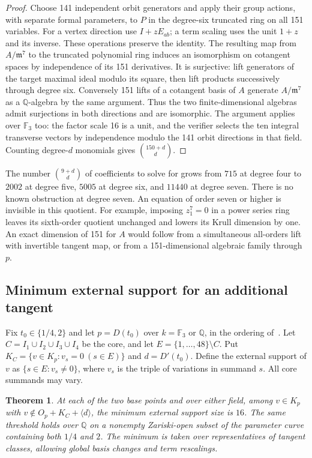 \documentclass[11pt,reqno]{amsart}
\newcommand{\F}{\mathbb F}
\newcommand{\Q}{\mathbb Q}
\newtheorem{theorem}{Theorem}[section]
\begin{document}
\begin{proof}
Choose 141 independent orbit generators and apply their group actions, with separate formal parameters, to \(P\) in the degree-six truncated ring on all 151 variables. For a vertex direction use \(I+zE_{ab}\); a term scaling uses the unit \(1+z\) and its inverse. These operations preserve the identity. The resulting map from \(A/\mathfrak m^7\) to the truncated polynomial ring induces an isomorphism on cotangent spaces by independence of its 151 derivatives. It is surjective: lift generators of the target maximal ideal modulo its square, then lift products successively through degree six. Conversely 151 lifts of a cotangent basis of \(A\) generate \(A/\mathfrak m^7\) as a \(\Q\)-algebra by the same argument. Thus the two finite-dimensional algebras admit surjections in both directions and are isomorphic. The argument applies over \(\F_3\) too: the factor scale 16 is a unit, and the verifier selects the ten integral transverse vectors by independence modulo the 141 orbit directions in that field. Counting degree-\(d\) monomials gives \(\binom{150+d}{d}\).
\end{proof}

The number \(\binom{9+d}{d}\) of coefficients to solve for grows from \(715\) at degree four to \(2002\) at degree five, \(5005\) at degree six, and \(11440\) at degree seven. There is no known obstruction at degree seven. An equation of order seven or higher is invisible in this quotient. For example, imposing \(z_1^7=0\) in a power series ring leaves its sixth-order quotient unchanged and lowers its Krull dimension by one. An exact dimension of 151 for \(A\) would follow from a simultaneous all-orders lift with invertible tangent map, or from a 151-dimensional algebraic family through \(p\).

\subsection*{Minimum external support for an additional tangent}
Fix \(t_0\in\{1/4,2\}\) and let \(p=D(t_0)\) over \(k=\F_3\) or \(\Q\), in the ordering of~\cite[Appendix A]{lwh}. Let \(C=I_1\cup I_2\cup I_3\cup I_4\) be the core, and let \(E=\{1,\ldots,48\}\setminus C\). Put \(K_C=\{v\in K_p:v_s=0\ (s\in E)\}\) and \(d=D'(t_0)\). Define the external support of \(v\) as \(\{s\in E:v_s\ne0\}\), where \(v_s\) is the triple of variations in summand \(s\). All core summands may vary.

\begin{theorem}\label{thm:external}
At each of the two base points and over either field, among \(v\in K_p\) with \(v\notin O_p+K_C+\langle d\rangle\), the minimum external support size is \(16\). The same threshold holds over \(\Q\) on a nonempty Zariski-open subset of the parameter curve containing both \(1/4\) and \(2\). The minimum is taken over representatives of tangent classes, allowing global basis changes and term rescalings.
\end{theorem}
\end{document}
